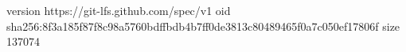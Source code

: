 version https://git-lfs.github.com/spec/v1
oid sha256:8f3a185f87f8c98a5760bdffbdb4b7ff0de3813c80489465f0a7c050ef17806f
size 137074
